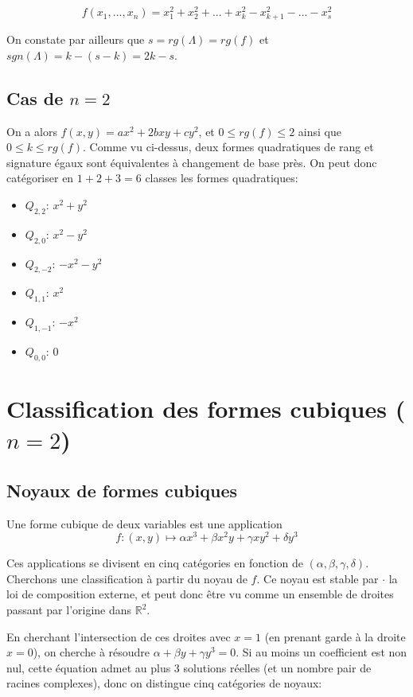 \documentclass{article}
\begin{document}
$$f(x_1,...,x_n)=x_1^2+x_2^2+...+x_k^2-x_{k+1}^2-...-x_s^2$$

On constate par ailleurs que $s=rg(\Lambda)=rg(f)$ et $sgn(\Lambda)=k-(s-k)=2k-s$.

\subsection{Cas de $n=2$}

On a alors $f(x,y)=ax^2+2bxy+cy^2$, et $0\leq rg(f)\leq 2$ ainsi que $0\leq k\leq rg(f)$. Comme vu ci-dessus, deux formes quadratiques de rang et signature égaux sont équivalentes à changement de base près. On peut donc catégoriser en $1+2+3=6$ classes les formes quadratiques:


\begin{itemize}
\item  $Q_{2,2}$: $x^2+y^2$
\item  $Q_{2,0}$: $x^2-y^2$
\item  $Q_{2,-2}$: $-x^2-y^2$
\item  $Q_{1,1}$: $x^2$
\item  $Q_{1,-1}$: $-x^2$
\item  $Q_{0,0}$: $0$

\end{itemize}

\section{Classification des formes cubiques ($n=2$)}

\subsection{Noyaux de formes cubiques}

Une forme cubique de deux variables est une application $$f: (x,y) \mapsto \alpha x^3+\beta x^2y+\gamma xy^2+\delta y^3$$

Ces applications se divisent en cinq catégories en fonction de $(\alpha,\beta,\gamma,\delta)$. Cherchons une classification à partir du noyau de $f$. Ce noyau est stable par $\cdot$ la loi de composition externe, et peut donc être vu comme un ensemble de droites passant par l'origine dans $\mathbb{R}^2$.

En cherchant l'intersection de ces droites avec $x=1$ (en prenant garde à la droite $x=0$), on cherche à résoudre $\alpha+\beta y+\gamma y^3=0$. Si au moins un coefficient est non nul, cette équation admet au plus 3 solutions réelles (et un nombre pair de racines complexes), donc on distingue cinq catégories de noyaux:
\end{document}
